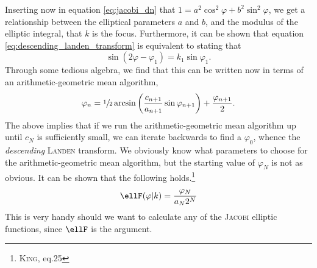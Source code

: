 Inserting now in equation \eqref{eq:jacobi_dn} that $1 = a^2 \cos^2{\varphi} + b^2 \sin^2{\varphi}$, we get a relationship between the elliptical parameters $a$ and $b$, and the modulus of the elliptic integral, that $k$ is the focus.
Furthermore, it can be shown that equation \eqref{eq:descending_landen_transform} is equivalent to stating that
\[
\sin{( 2\varphi - \varphi_1 )} = k_1 \sin{\varphi_1}.
\]
Through some tedious algebra, we find that this can be written now in terms of an arithmetic-geometric mean algorithm,
\begin{equation}\label{eq:AGM_phi}
\varphi_n = \sfrac{1}{2} \arcsin{\left( \frac{c_{n+1}}{a_{n+1}} \sin{\varphi_{n+1}} \right)} + \frac{\varphi_{n+1}}{2}.
\end{equation}
The above implies that if we run the arithmetic-geometric mean algorithm up until $c_N$ is sufficiently small, we can iterate backwards to find a $\varphi_0$, whence the \emph{descending} \textsc{Landen} transform.
We obviously know what parameters to choose for the arithmetic-geometric mean algorithm, but the starting value of $\varphi_N$ is not as obvious.
It can be shown that the following holds.\footnote{\cite{king1924direct} \textsc{King}, eq.25}
\begin{equation}\label{eq:AGM_ellF}
\ellF(\varphi \vert k) = \frac{\varphi_N}{a_N 2^N}
\end{equation}
This is very handy should we want to calculate any of the \textsc{Jacobi} elliptic functions, since $\ellF$ is the argument.
